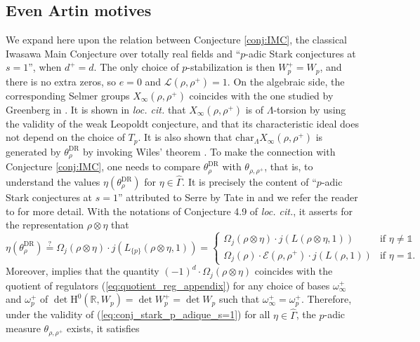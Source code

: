 \documentclass[12pt]{amsart}
\newcommand\bR{\mathbb{R}}
\newcommand\cE{\mathcal{E}}
\newcommand\cL{\mathcal{L}}
\renewcommand{\char}{\textrm{char}}
\newcommand{\HH}{\mathrm{H}}
\newcommand{\DR}{\mathrm{DR}}
\theoremstyle{defstyle}
\theoremstyle{thmstyle}
\begin{document}
\subsection{Even Artin motives}\label{sec:exemple_even_motives}
We expand here upon the relation between Conjecture \ref{conj:IMC}, the  classical Iwasawa Main Conjecture over totally real fields and ``$p$-adic Stark conjectures at $s=1$'', when $d^+=d$. The only choice of $p$-stabilization is then $W_p^+=W_p$, and there is no extra zeros, so $e=0$ and $\cL(\rho,\rho^+)=1$. On the algebraic side, the corresponding Selmer groups $X_\infty(\rho,\rho^+)$ coincides with the one studied by Greenberg in \cite{greenbergartinII}. It is shown in \textit{loc. cit.} that $X_\infty(\rho,\rho^+)$ is of $\Lambda$-torsion by using the validity of the weak Leopoldt conjecture, and that its characteristic ideal does not depend on the choice of $T_p$. It is also shown that $\char_\Lambda X_\infty(\rho,\rho^+)$ is generated by $\theta^\DR_\rho$ by invoking Wiles' theorem \cite[Thm. 1.3]{wiles1990iwasawa}. To make the connection with Conjecture \ref{conj:IMC}, one needs to compare $\theta^\DR_\rho$ with $\theta_{\rho,\rho^+}$, that is, to understand the values $\eta(\theta^\DR_\rho)$ for $\eta\in\widehat{\Gamma}$. It is precisely the content of ``$p$-adic Stark conjectures at $s=1$'' attributed to Serre by Tate in \cite[Chapitre VI, §5]{tate} and we refer the reader to \cite[§4.4]{johnstonnickelpadicstark} for more detail. With the notations of Conjecture 4.9 of \textit{loc. cit.}, it asserts for the representation $\rho\otimes\eta$ that 
\begin{equation}\label{eq:conj_stark_p_adique_s=1}
\eta(\theta^\DR_\rho) \overset{?}{=} \Omega_j(\rho\otimes\eta)\cdot j\left(L_{\{p\}}(\rho\otimes\eta,1)\right)=\left\{\begin{array}{lr}\Omega_j(\rho\otimes\eta)\cdot j\left(L(\rho\otimes\eta,1)\right) & \mbox{if }\eta\neq\mathds{1}\\ \Omega_j(\rho)\cdot\cE(\rho,\rho^+)\cdot j\left(L(\rho,1)\right) & \mbox{if }\eta=\mathds{1}. \end{array}\right.
\end{equation}
Moreover, \cite[Lem. 4.20]{johnstonnickelpadicstark} implies that the quantity $(-1)^d\cdot \Omega_j(\rho\otimes\eta)$ coincides with the quotient of regulators (\ref{eq:quotient_reg_appendix}) for any choice of bases $\omega_\infty^+$ and $\omega_p^+$ of $\det\HH^0(\bR,W_p)=\det W_p^+=\det W_p$ such that $\omega_\infty^+=\omega_p^+$. Therefore, under the validity of (\ref{eq:conj_stark_p_adique_s=1}) for all $\eta\in\widehat{\Gamma}$, the $p$-adic measure $\theta_{\rho,\rho^+}$ exists, it satisfies 
\end{document}
